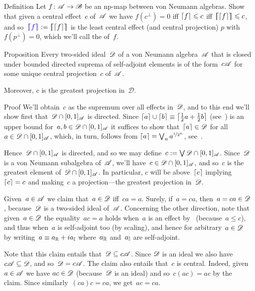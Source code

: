 \documentclass[a]{subfiles}
\begin{document}
\begin{parsec}%
\begin{point}{Definition}%
Let $f\colon \mathscr{A}\to\mathscr{B}$
be an np-map
between von Neumann algebras.
Show that given a central effect~$c$
of~$\mathscr{A}$ we have
$f(c^\perp)=0$
iff $\left\lceil f\right\rceil\leqslant c$
iff $\left\lceil\!\!\left\lceil\left\lceil f\right\rceil\right\rceil\!\!\right\rceil\leqslant c$,
and so~$\Define{\cceil{f}}:=\cceil{\ceil{f}}$
is the least central effect
(and central projection) $p$
with~$f(p^\perp)=0$,
which we'll call the  of~$f$.
\end{point}
\begin{point}{Proposition}%
Every two-sided ideal~$\mathscr{D}$ of a von Neumann
algebra~$\mathscr{A}$
that is closed under bounded directed suprema of self-adjoint 
elements
is of the form~$c\mathscr{A}$
for some unique central projection~$c$ of~$\mathscr{A}$.

Moreover, $c$ is the greatest projection in~$\mathscr{D}$.
\begin{point}{Proof}%
We'll obtain~$c$ as the supremum over all effects in~$\mathscr{D}$,
and to this end we'll show first that~$\mathscr{D}\cap [0,1]_{\mathscr{A}}$
is directed.
Since $\left\lceil a\right\rceil\cup \left\lceil b\right\rceil \equiv \left\lceil\frac{1}{2}a+\frac{1}{2}b\right\rceil$
(see~)
is an upper bound for~$a,b\in\mathscr{D}\cap [0,1]_{\mathscr{A}}$
it suffices to show that~$\left\lceil a\right\rceil\in \mathscr{D}$
for all~$a\in \mathscr{D}\cap[0,1]_{\mathscr{A}}$,
which, in turn,
follows from
$\left\lceil a\right\rceil=\bigvee_n a^{\nicefrac{1}{2^n}}$,
see~.

Hence~$\mathscr{D}\cap [0,1]_{\mathscr{A}}$ is directed,
and so we may define~$c:=\bigvee \mathscr{D}\cap[0,1]_{\mathscr{A}}$.
Since~$\mathscr{D}$ is a von Neumann subalgebra of~$\mathscr{A}$,
we'll have~$c\in\mathscr{D}\cap[0,1]_{\mathscr{A}}$,
and so~$c$ is the greatest element of~$\mathscr{D}\cap[0,1]_{\mathscr{A}}$.
In particular,
$c$ will be above~$\left\lceil c\right\rceil$ implying~$\left\lceil c\right\rceil=c$
and making~$c$ a projection---the greatest projection in~$\mathscr{D}$.

Given~$a\in\mathscr{A}$ we claim that~$a\in \mathscr{D}$
iff~$ca=a$.
Surely, if~$a=ca$,
then~$a=ca\in \mathscr{D}$,
because~$\mathscr{D}$ is a two-sided ideal of~$\mathscr{A}$.
Concerning the other direction,
note that given~$a\in \mathscr{D}$
the equality~$ac=a$ holds
when~$a$ is an effect by~ (because~$a\leq c$),
and thus when~$a$ is self-adjoint too
(by scaling),
and hence for arbitrary~$a\in\mathscr{D}$
by  writing~$a\equiv a_{\mathbb{R}}+ia_{\mathbb{I}}$
where~$a_{\mathbb{R}}$ and~$a_{\mathbb{I}}$ are self-adjoint.

Note that this claim entails that~$\mathscr{D} \subseteq c\mathscr{A}$.
Since $\mathscr{D}$ is an ideal
we also have~$c\mathscr{A}\subseteq \mathscr{D}$,
and so~$\mathscr{D}= c\mathscr{A}$.
The claim also entails that~$c$ is central.
Indeed,
given~$a\in\mathscr{A}$
we have $ac\in \mathscr{D}$ 
(because~$\mathscr{D}$ is an ideal)
and so~$c(ac)=ac$ by the claim.
Since similarly~$(ca)c=ca$,
we get~$ac=ca$.


\end{point}
\end{point}
\end{parsec}
\end{document}
